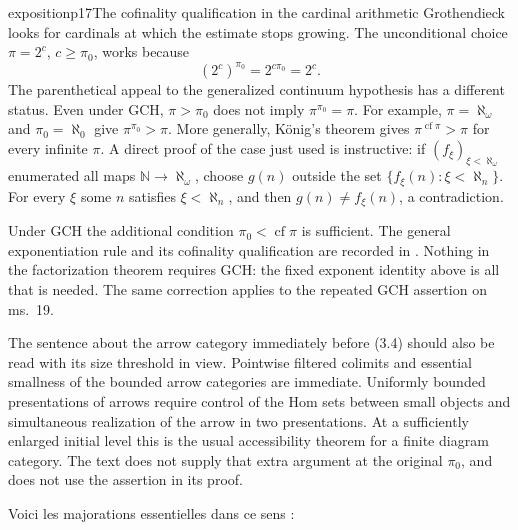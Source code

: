 \begin{dcomment}{exposition}{p17}{The cofinality qualification in the cardinal arithmetic}
Grothendieck looks for cardinals at which the estimate stops growing. The unconditional choice $\pi=2^c$, $c\geq\pi_0$, works because
\[
(2^c)^{\pi_0}=2^{c\pi_0}=2^c.
\]
The parenthetical appeal to the generalized continuum hypothesis has a different status. Even under GCH, $\pi>\pi_0$ does not imply $\pi^{\pi_0}=\pi$. For example, $\pi=\aleph_\omega$ and $\pi_0=\aleph_0$ give $\pi^{\pi_0}>\pi$. More generally, K\"onig's theorem gives $\pi^{\operatorname{cf}\pi}>\pi$ for every infinite $\pi$. A direct proof of the case just used is instructive: if $(f_\xi)_{\xi<\aleph_\omega}$ enumerated all maps $\mathbb N\to\aleph_\omega$, choose $g(n)$ outside the set $\{f_\xi(n):\xi<\aleph_n\}$. For every $\xi$ some $n$ satisfies $\xi<\aleph_n$, and then $g(n)\ne f_\xi(n)$, a contradiction.

Under GCH the additional condition $\pi_0<\operatorname{cf}\pi$ is sufficient. The general exponentiation rule and its cofinality qualification are recorded in \citet[Theorems 10.12 and 11.7, Exercise 11.8]{Marks2026}. Nothing in the factorization theorem requires GCH: the fixed exponent identity above is all that is needed. The same correction applies to the repeated GCH assertion on ms.~19.

The sentence about the arrow category immediately before (3.4) should also be read with its size threshold in view. Pointwise filtered colimits and essential smallness of the bounded arrow categories are immediate. Uniformly bounded presentations of arrows require control of the Hom sets between small objects and simultaneous realization of the arrow in two presentations. At a sufficiently enlarged initial level this is the usual accessibility theorem for a finite diagram category. The text does not supply that extra argument at the original $\pi_0$, and does not use the assertion in its proof.
\end{dcomment}



Voici les majorations essentielles dans ce sens :

